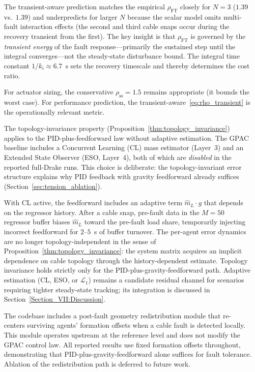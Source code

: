 The transient-aware prediction matches the empirical $\rho_{\mathrm{FT}}$ closely for $N{=}3$ ($1.39$ vs.\ $1.39$) and underpredicts for larger $N$ because the scalar model omits multi-fault interaction effects (the second and third cable snaps occur during the recovery transient from the first). The key insight is that $\rho_{\mathrm{FT}}$ is governed by the \emph{transient energy} of the fault response---primarily the sustained step until the integral converges---not the steady-state disturbance bound. The integral time constant $1/k_i \approx 6.7$~s sets the recovery timescale and thereby determines the cost ratio.

For actuator sizing, the conservative $\rho_{\mathrm{ss}} = 1.5$ remains appropriate (it bounds the worst case). For performance prediction, the transient-aware~\eqref{eq:rho_transient} is the operationally relevant metric.

The topology-invariance property (Proposition~\ref{thm:topology_invariance}) applies to the PID-plus-feedforward law without adaptive estimation. The GPAC baseline includes a Concurrent Learning (CL) mass estimator (Layer~3) and an Extended State Observer (ESO, Layer~4), both of which are \emph{disabled} in the reported full-Drake runs. This choice is deliberate: the topology-invariant error structure explains why PID feedback with gravity feedforward already suffices (Section~\ref{sec:tension_ablation}).

With CL active, the feedforward includes an adaptive term $\hat{m}_L \cdot g$ that depends on the regressor history. After a cable snap, pre-fault data in the $M{=}50$ regressor buffer biases $\hat{m}_L$ toward the pre-fault load share, temporarily injecting incorrect feedforward for $2$--$5$~s of buffer turnover. The per-agent error dynamics are no longer topology-independent in the sense of Proposition~\ref{thm:topology_invariance}: the system matrix acquires an implicit dependence on cable topology through the history-dependent estimate. Topology invariance holds strictly only for the PID-plus-gravity-feedforward path. Adaptive estimation (CL, ESO, or $\mathcal{L}_1$) remains a candidate residual channel for scenarios requiring tighter steady-state tracking; its integration is discussed in Section~\ref{Section_VII:Discussion}.

\begin{remark}
The codebase includes a post-fault geometry redistribution module that re-centers surviving agents' formation offsets when a cable fault is detected locally. This module operates upstream at the reference level and does not modify the GPAC control law. All reported results use fixed formation offsets throughout, demonstrating that PID-plus-gravity-feedforward alone suffices for fault tolerance. Ablation of the redistribution path is deferred to future work.
\end{remark}

